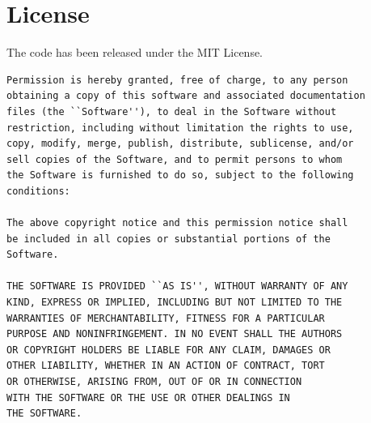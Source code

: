 \documentclass[12pt,titlepage,justified]{article}
\begin{document}

\section{License}
The code has been released under the MIT License. 
\begin{verbatim}
Permission is hereby granted, free of charge, to any person 
obtaining a copy of this software and associated documentation 
files (the ``Software''), to deal in the Software without 
restriction, including without limitation the rights to use, 
copy, modify, merge, publish, distribute, sublicense, and/or
sell copies of the Software, and to permit persons to whom 
the Software is furnished to do so, subject to the following 
conditions:

The above copyright notice and this permission notice shall 
be included in all copies or substantial portions of the 
Software.

THE SOFTWARE IS PROVIDED ``AS IS'', WITHOUT WARRANTY OF ANY 
KIND, EXPRESS OR IMPLIED, INCLUDING BUT NOT LIMITED TO THE 
WARRANTIES OF MERCHANTABILITY, FITNESS FOR A PARTICULAR 
PURPOSE AND NONINFRINGEMENT. IN NO EVENT SHALL THE AUTHORS 
OR COPYRIGHT HOLDERS BE LIABLE FOR ANY CLAIM, DAMAGES OR 
OTHER LIABILITY, WHETHER IN AN ACTION OF CONTRACT, TORT 
OR OTHERWISE, ARISING FROM, OUT OF OR IN CONNECTION 
WITH THE SOFTWARE OR THE USE OR OTHER DEALINGS IN 
THE SOFTWARE.
\end{verbatim}
\end{document}
